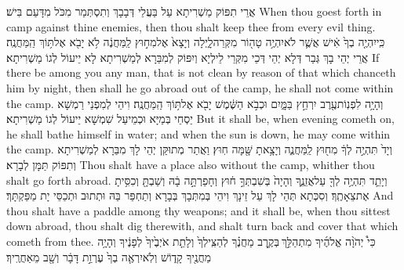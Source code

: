 {אֲרֵי תִפּוֹק מַשְׁרִיתָא עַל בַּעֲלֵי דְּבָבָךְ וְתִסְתְּמַר מִכֹּל מִדָּעַם בִּישׁ׃}
{When thou goest forth in camp against thine enemies, then thou shalt keep thee from every evil thing.}{}
{כִּֽי\maqqaf יִהְיֶ֤ה בְךָ֙ אִ֔ישׁ אֲשֶׁ֛ר לֹא\maqqaf יִהְיֶ֥ה טָה֖וֹר מִקְּרֵה\maqqaf לָ֑יְלָה וְיָצָא֙ אֶל\maqqaf מִח֣וּץ לַֽמַּחֲנֶ֔ה לֹ֥א יָבֹ֖א אֶל\maqqaf תּ֥וֹךְ הַֽמַּחֲנֶֽה׃}
{אֲרֵי יְהֵי בָךְ גְּבַר דְּלָא יְהֵי דְּכֵי מִקְּרֵי לֵילְיָא וְיִפּוֹק לְמִבַּרָא לְמַשְׁרִיתָא לָא יֵיעוֹל לְגוֹ מַשְׁרִיתָא׃}
{If there be among you any man, that is not clean by reason of that which chanceth him by night, then shall he go abroad out of the camp, he shall not come within the camp.}{}
{וְהָיָ֥ה לִפְנֽוֹת\maqqaf עֶ֖רֶב יִרְחַ֣ץ בַּמָּ֑יִם וּכְבֹ֣א הַשֶּׁ֔מֶשׁ יָבֹ֖א אֶל\maqqaf תּ֥וֹךְ הַֽמַּחֲנֶֽה׃}
{וִיהֵי לְמִפְנֵי רַמְשָׁא יַסְחֵי בְּמַיָּא וּכְמֵיעַל שִׁמְשָׁא יֵיעוֹל לְגוֹ מַשְׁרִיתָא׃}
{But it shall be, when evening cometh on, he shall bathe himself in water; and when the sun is down, he may come within the camp.}{}
{וְיָד֙ תִּהְיֶ֣ה לְךָ֔ מִח֖וּץ לַֽמַּחֲנֶ֑ה וְיָצָ֥אתָ שָּׁ֖מָּה חֽוּץ׃}
{וַאֲתַר מְתוּקַּן יְהֵי לָךְ מִבַּרָא לְמַשְׁרִיתָא וְתִפּוֹק תַּמָּן לְבָרָא׃}
{Thou shalt have a place also without the camp, whither thou shalt go forth abroad.}{}
{וְיָתֵ֛ד תִּהְיֶ֥ה לְךָ֖ עַל\maqqaf אֲזֵנֶ֑ךָ וְהָיָה֙ בְּשִׁבְתְּךָ֣ ח֔וּץ וְחָפַרְתָּ֣ה בָ֔הּ וְשַׁבְתָּ֖ וְכִסִּ֥יתָ אֶת\maqqaf צֵאָתֶֽךָ׃}
{וְסִכְּתָא תְּהֵי לָךְ עַל זֵינָךְ וִיהֵי בְּמִתְּבָךְ בְּבָרָא וְתַחְפַּר בַּהּ וּתְתוּב וּתְכַסֵּי יָת מַפַּקְתָּךְ׃}
{And thou shalt have a paddle among thy weapons; and it shall be, when thou sittest down abroad, thou shalt dig therewith, and shalt turn back and cover that which cometh from thee.}{}
{כִּי֩ יְהֹוָ֨ה אֱלֹהֶ֜יךָ מִתְהַלֵּ֣ךְ \legarmeh  בְּקֶ֣רֶב מַחֲנֶ֗ךָ לְהַצִּֽילְךָ֙ וְלָתֵ֤ת אֹיְבֶ֙יךָ֙ לְפָנֶ֔יךָ וְהָיָ֥ה מַחֲנֶ֖יךָ קָד֑וֹשׁ וְלֹֽא\maqqaf יִרְאֶ֤ה בְךָ֙ עֶרְוַ֣ת דָּבָ֔ר וְשָׁ֖ב מֵאַחֲרֶֽיךָ׃ \setuma }
